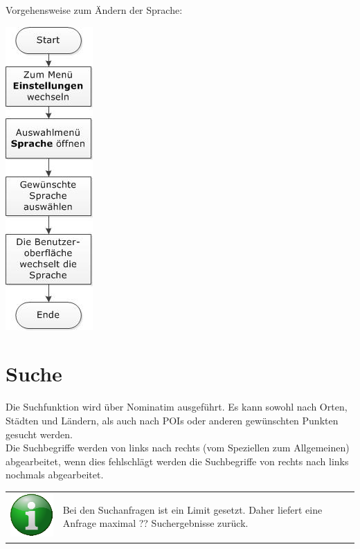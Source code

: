 \documentclass[10pt]{scrreprt}
\begin{document}
\vspace{3mm}
Vorgehensweise zum Ändern der Sprache:
\vspace{3mm}
\begin{center}
\includegraphics[scale=0.7]{images/sprache.jpeg}
\end{center}



\newpage
\section{Suche} 
Die Suchfunktion wird über Nominatim  ausgeführt. Es kann sowohl nach Orten, Städten und Ländern, als auch nach POIs oder anderen gewünschten Punkten gesucht werden.\\

Die Suchbegriffe werden von links nach rechts (vom Speziellen zum Allgemeinen) abgearbeitet, wenn dies fehlschlägt werden die Suchbegriffe von rechts nach links nochmals abgearbeitet.\\

\vspace{3mm}
\begin{tabular}{>{\centering \arraybackslash}m{1cm} m{14cm}}
\includegraphics[scale=0.5]{images/info.eps} & Bei den Suchanfragen ist ein Limit gesetzt. Daher liefert eine Anfrage maximal ?? Suchergebnisse zurück. \\ 
\end{tabular} 
\end{document}
